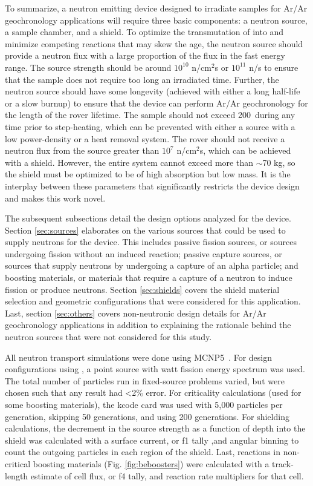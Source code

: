 \documentclass{mc2015}
\begin{document}
To summarize, a neutron emitting device designed to irradiate samples for Ar/Ar geochronology applications will require three basic components: a neutron source, a sample chamber, and a shield. To optimize the transmutation of  into  and minimize competing reactions that may skew the age, the neutron source should provide a neutron flux with a large proportion of the flux in the fast energy range. The source strength should be around $10^{10}$ n/cm$^2$s or $10^{11}$ n/s to ensure that the sample does not require too long an irradiated time. Further, the neutron source should have some longevity (achieved with either a long half-life or a slow burnup) to ensure that the device can perform Ar/Ar geochronology for the length of the rover lifetime. The sample should not exceed 200\celsius\ during any time prior to step-heating, which can be prevented with either a source with a low power-density or a heat removal system. The rover should not receive a neutron flux from the source greater than $10^7$ n/cm$^2$s, which can be achieved with a shield. However, the entire system cannot exceed more than $\sim$70 kg, so the shield must be optimized to be of high absorption but low mass. It is the interplay between these parameters that significantly restricts the device design and makes this work novel. 

The subsequent subsections detail the design options analyzed for the device. Section \ref{sec:sources} elaborates on the various sources that could be used to supply neutrons for the device. This includes passive fission sources, or sources undergoing fission without an induced reaction; passive capture sources, or sources that supply neutrons by undergoing a capture of an alpha particle; and boosting materials, or materials that require a capture of a neutron to induce fission or produce neutrons. Section \ref{sec:shields} covers the shield material selection and geometric configurations that were considered for this application. Last, section \ref{sec:others} covers non-neutronic design details for Ar/Ar geochronology applications in addition to explaining the rationale behind the neutron sources that were not considered for this study. 

All neutron transport simulations were done using MCNP5~\cite{brown_mcnp_2002}. For design configurations using , a point source with watt fission energy spectrum was used. The total number of particles run in fixed-source problems varied, but were chosen such that any result had <2\% error. For criticality calculations (used for some boosting materials), the kcode card was used with 5,000 particles per generation, skipping 50 generations, and using 200 generations. For shielding calculations, the decrement in the source strength as a function  of depth into the shield was calculated with a surface current, or f1 tally ,and angular binning to count the outgoing particles in each region of the shield.
 Last, reactions in non-critical boosting materials (Fig. \ref{fig:beboosters}) were calculated with a track-length estimate of cell flux, or f4 tally, and reaction rate multipliers for that cell.
\end{document}
